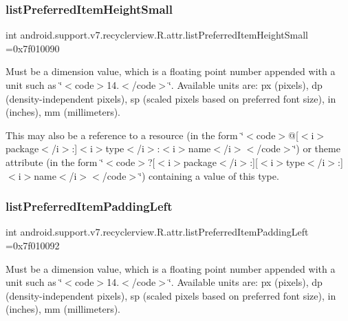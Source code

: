 \subsubsection{\texorpdfstring{list\+Preferred\+Item\+Height\+Small}{listPreferredItemHeightSmall}}
{\footnotesize\ttfamily int android.\+support.\+v7.\+recyclerview.\+R.\+attr.\+list\+Preferred\+Item\+Height\+Small =0x7f010090\hspace{0.3cm}{\ttfamily [static]}}

Must be a dimension value, which is a floating point number appended with a unit such as \char`\"{}$<$code$>$14.\+5sp$<$/code$>$\char`\"{}. Available units are\+: px (pixels), dp (density-\/independent pixels), sp (scaled pixels based on preferred font size), in (inches), mm (millimeters). 

This may also be a reference to a resource (in the form \char`\"{}$<$code$>$@\mbox{[}$<$i$>$package$<$/i$>$\+:\mbox{]}$<$i$>$type$<$/i$>$\+:$<$i$>$name$<$/i$>$$<$/code$>$\char`\"{}) or theme attribute (in the form \char`\"{}$<$code$>$?\mbox{[}$<$i$>$package$<$/i$>$\+:\mbox{]}\mbox{[}$<$i$>$type$<$/i$>$\+:\mbox{]}$<$i$>$name$<$/i$>$$<$/code$>$\char`\"{}) containing a value of this type. \mbox{\label{classandroid_1_1support_1_1v7_1_1recyclerview_1_1R_1_1attr_acb9355683e3619774644f0460c0a1164}} 
\subsubsection{\texorpdfstring{list\+Preferred\+Item\+Padding\+Left}{listPreferredItemPaddingLeft}}
{\footnotesize\ttfamily int android.\+support.\+v7.\+recyclerview.\+R.\+attr.\+list\+Preferred\+Item\+Padding\+Left =0x7f010092\hspace{0.3cm}{\ttfamily [static]}}

Must be a dimension value, which is a floating point number appended with a unit such as \char`\"{}$<$code$>$14.\+5sp$<$/code$>$\char`\"{}. Available units are\+: px (pixels), dp (density-\/independent pixels), sp (scaled pixels based on preferred font size), in (inches), mm (millimeters). 


